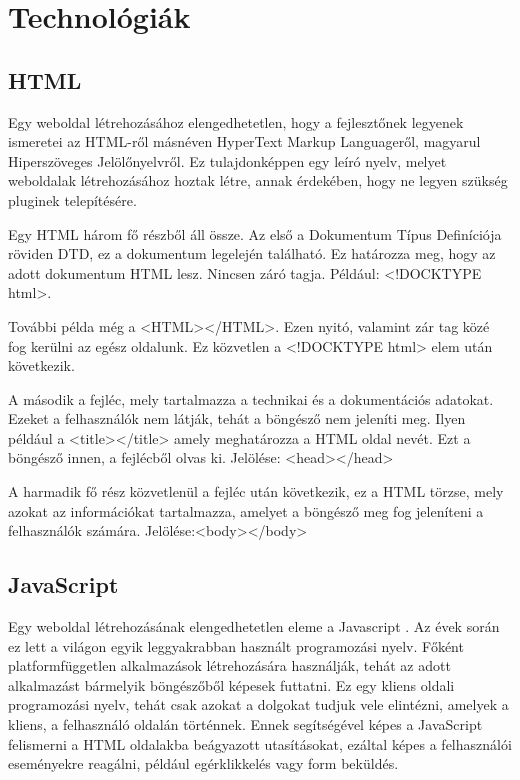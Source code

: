 \chapter{Technológiák}
\overfullrule=0pt
\section{HTML}

Egy weboldal létrehozásához elengedhetetlen, hogy a fejlesztőnek legyenek ismeretei az HTML-ről \cite{1} másnéven HyperText Markup Languageről, magyarul Hiperszöveges Jelölőnyelvről. Ez tulajdonképpen egy leíró nyelv, melyet weboldalak létrehozásához hoztak létre, annak érdekében, hogy ne legyen szükség pluginek telepítésére.

Egy HTML három fő részből áll össze. Az első a Dokumentum Típus Definíciója röviden DTD, ez a dokumentum legelején található. Ez határozza meg, hogy az adott dokumentum HTML lesz. Nincsen záró tagja. Például: <!DOCKTYPE html>. 

További példa még a <HTML></HTML>. Ezen nyitó, valamint zár tag közé fog kerülni az egész oldalunk. Ez közvetlen a <!DOCKTYPE html> elem után következik.

A második a fejléc, mely tartalmazza a technikai és a dokumentációs adatokat. Ezeket a felhasználók nem látják, tehát a böngésző nem jeleníti meg. Ilyen például a <title></title> amely meghatározza a HTML oldal nevét. Ezt a böngésző innen, a fejlécből olvas ki. Jelölése: <head></head>

A harmadik fő rész közvetlenül a fejléc után következik, ez a HTML törzse, mely azokat az információkat tartalmazza, amelyet a böngésző meg fog jeleníteni a felhasználók számára. Jelölése:<body></body>


\section{JavaScript}

Egy weboldal létrehozásának elengedhetetlen eleme a Javascript \cite{2}. Az évek során ez lett a világon egyik leggyakrabban használt programozási nyelv. Főként platformfüggetlen alkalmazások létrehozására használják, tehát az adott alkalmazást bármelyik böngészőből képesek futtatni. Ez egy kliens oldali programozási nyelv, tehát csak azokat a dolgokat tudjuk vele elintézni, amelyek a kliens, a felhasználó oldalán történnek. Ennek segítségével képes a JavaScript felismerni a HTML oldalakba beágyazott utasításokat, ezáltal képes a felhasználói eseményekre reagálni, például egérklikkelés vagy form beküldés.

